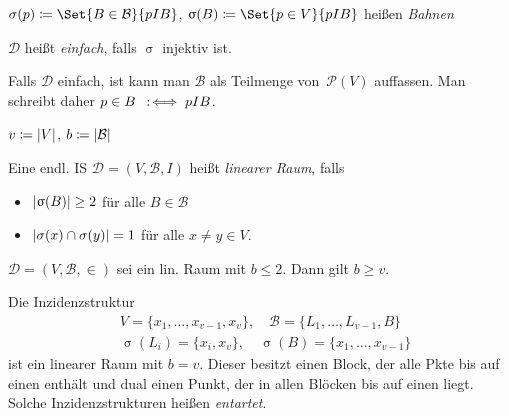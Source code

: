 \documentclass{cheat-sheet}
\newcommand{\Design}{\mathcal{D}} %
\newcommand{\Blocks}{\mathcal{B}} %
\newcommand{\Pow}{\mathcal{P}} %
\begin{document}
\begin{defn}
  $\sigma(p) \coloneqq \Set{B \in \Blocks}{p I B}$,
  $\upsigma(B) \coloneqq \Set{p \in V}{p I B}$ \enspace
  heißen \emph{Bahnen}
\end{defn}

\begin{defn}
  $\Design$ heißt \emph{einfach}, falls $\upsigma$ injektiv ist.
\end{defn}

\begin{nota}
  Falls $\Design$ einfach, ist kann man $\Blocks$ als Teilmenge von~$\Pow(V)$ auffassen. Man schreibt daher
  $p \in B \enspace:\!\iff p I B$.
\end{nota}

\begin{nota}
  $v \coloneqq \lvert V\rvert$, \enspace
  $b \coloneqq \abs{\Blocks}$
\end{nota}

\begin{defn}
  Eine endl. IS $\Design = (V, \Blocks, I)$ heißt \emph{linearer Raum}, falls
  \begin{itemize}
    \item $\lvert\upsigma(B)\rvert \geq 2$ für alle $B \in \Blocks$
    \item $\lvert\sigma(x) \cap \sigma(y)\rvert = 1$ für alle $x \neq y \in V$.
  \end{itemize}
\end{defn}


\begin{satz}
  $\Design = (V, \Blocks, {\in})$ sei ein lin. Raum mit $b \leq 2$.
  Dann gilt $b \geq v$.
\end{satz}


\begin{bsp}
  Die Inzidenzstruktur
  \begin{align*}
    & V = \{ x_1, \ldots, x_{v-1}, x_v \}, \quad
    \Blocks = \{ L_1, \ldots, L_{v-1}, B \} \\
    & \upsigma(L_i) = \{ x_i, x_v \}, \quad
    \upsigma(B) = \{ x_1, \ldots, x_{v-1} \}
  \end{align*}
  ist ein linearer Raum mit $b = v$.
  Dieser besitzt einen Block, der alle Pkte bis auf einen enthält und dual einen Punkt, der in allen Blöcken bis auf einen liegt.
  Solche Inzidenzstrukturen heißen \emph{entartet}.
\end{bsp}
\end{document}
